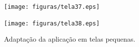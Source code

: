 \begin{figure}[ht]
  \centering
  \begin{minipage}[b]{0.49\textwidth}
    \texttt{[image: figuras/tela37.eps]}
  \end{minipage}
  \hfill
  \begin{minipage}[b]{0.49\textwidth}
    \texttt{[image: figuras/tela38.eps]}
  \end{minipage}
  \caption{Adaptação da aplicação em telas pequenas.}
  \label{comp1}
\end{figure}


